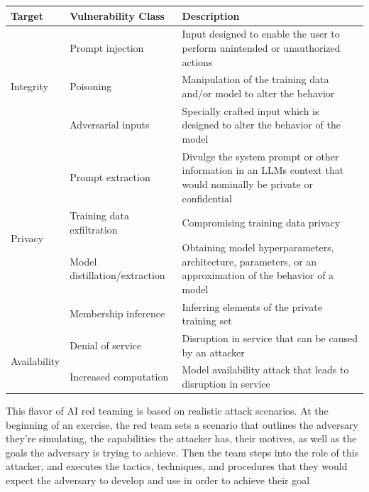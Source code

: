 \begin{table}[ht!]
    \centering
    \scriptsize
    \begin{tabular}{p{2.5cm}p{5cm}p{5cm}}
    \toprule
    Target & Vulnerability Class & Description \\
    \midrule
    \multirow[t]{3}{*}{Integrity} & Prompt injection & Input designed to enable the user to perform unintended or unauthorized actions \newline \\
    & Poisoning & Manipulation of the training data and/or model to alter the behavior \newline \\
    & Adversarial inputs & Specially crafted input which is designed to alter the behavior of the model \newline  \\
    \multirow[t]{4}{*}{Privacy} & Prompt extraction & Divulge the system prompt or other information in an LLMs context that would nominally be private or confidential \newline \\
     & Training data exfiltration & Compromising training data privacy \newline  \\
    & Model distillation/extraction & Obtaining model hyperparameters, architecture, parameters, or an approximation of the behavior of a model \newline \\
    & Membership inference & Inferring elements of the private training set \newline \\
    \multirow[t]{4}{*}{Availability} & Denial of service & Disruption in service that can be caused by an attacker \newline \\
     & Increased computation & Model availability attack that leads to disruption in service \newline \\
    \bottomrule
    \end{tabular}
    \label{tab:red_teaming}
\end{table}

This flavor of AI red teaming is based on realistic attack scenarios. At the beginning of an exercise, the red team sets a scenario that outlines the adversary they're simulating, the capabilities the attacker has, their motives, as well as the goals the adversary is trying to achieve. Then the team steps into the role of this attacker, and executes the tactics, techniques, and procedures that they would expect the adversary to develop and use in order to achieve their goal

